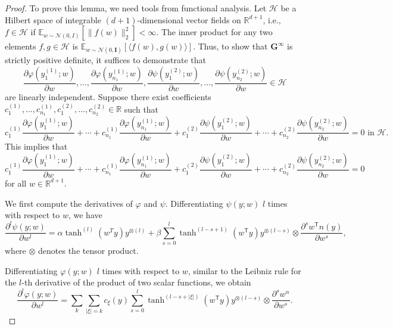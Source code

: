 \documentclass{article}
\newcommand{\T}{\mathsf{T}}
\begin{document}
\begin{proof}
To prove this lemma, we need tools from functional analysis. 
Let \(\mathcal{H}\) be a Hilbert space of integrable \((d+1)\)-dimensional vector fields on \(\mathbb{R}^{d+1}\), i.e., \(f \in \mathcal{H}\) if \(\mathbb{E}_{w \sim \mathcal{N}(0, I)}[\|f(w)\|_2^2] < \infty\).
The inner product for any two elements \(f, g \in \mathcal{H}\) is \(\mathbb{E}_{w \sim \mathcal{N}(0, \mathbf{I})}[\langle f(w), g(w) \rangle]\). Thus, to show that \(\mathbf{G}^{\infty}\) is strictly positive definite, it suffices to demonstrate that
\begin{equation*}
\frac{\partial \varphi(y_1^{(1)}; w)}{\partial w}, \ldots, \frac{\partial \varphi(y_{n_1}^{(1)}; w)}{\partial w}, 
\frac{\partial \psi(y_1^{(2)}; w)}{\partial w}, \ldots, \frac{\partial \psi(y_{n_2}^{(2)}; w)}{\partial w} \in \mathcal{H}
\end{equation*}
are linearly independent. 
Suppose there exist coefficients \(c_1^{(1)}, \ldots,c_{n_1}^{(1)}, c_1^{(2)}, \ldots, c_{n_2}^{(2)} \in \mathbb{R}\) such that
\begin{equation*}
c_1^{(1)} \frac{\partial \varphi(y_1^{(1)}; w)}{\partial w} + \cdots + c_{n_1}^{(1)} \frac{\partial \varphi(y_{n_1}^{(1)}; w)}{\partial w}
+ c_1^{(2)} \frac{\partial \psi(y_1^{(2)}; w)}{\partial w} + \cdots + c_{n_2}^{(2)}\frac{\partial \psi(y_{n_2}^{(2)}; w)}{\partial w}
= 0 \text{ in } \mathcal{H}.
\end{equation*}
This implies that
\begin{equation}
   c_1^{(1)} \frac{\partial \varphi(y_1^{(1)}; w)}{\partial w} + \cdots + c_{n_1}^{(1)} \frac{\partial \varphi(y_{n_1}^{(1)}; w)}{\partial w}
+ c_1^{(2)} \frac{\partial \psi(y_1^{(2)}; w)}{\partial w} + \cdots + c_{n_2}^{(2)}\frac{\partial \psi(y_{n_2}^{(2)}; w)}{\partial w}
= 0 \label{eq:lin_com_step1}
\end{equation}
for all \( w \in \mathbb{R}^{d+1} \).

We first compute the derivatives of \( \varphi \) and \( \psi \).
Differentiating \( \psi(y; w) \) \( l \) times with respect to \( w \), we have
\begin{equation*}
    \frac{\partial^l \psi(y; w)}{\partial w^l} = \alpha \tanh^{(l)}(w^T y) y^{\otimes (l)}+\beta \sum_{s=0}^{l}\tanh^{(l-s+1)}(w^\T y)y^{\otimes (l-s)}\otimes \frac{\partial^s w^\T n(y)}{\partial w^s},
\end{equation*}
where \( \otimes \) denotes the tensor product.

Differentiating \( \varphi(y; w) \) \( l \) times with respect to \( w \), similar to the Leibniz rule for the \( l \)-th derivative of the product of two scalar functions, we obtain
\begin{equation*}
    \frac{\partial^l \varphi(y; w)}{\partial w^l} = \sum_{k}\sum_{|\xi|=k}c_{\xi}(y)\sum_{s=0}^{l}\tanh^{(l-s+|\xi|)}(w^\T y)y^{\otimes (l-s)}\otimes \frac{\partial^s w^\alpha}{\partial w^s} .
\end{equation*}


\end{proof}
\end{document}
